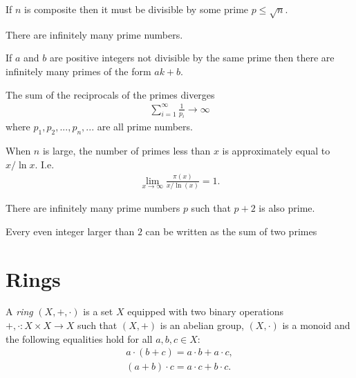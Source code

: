 \documentclass{article}
\begin{document}
\begin{theorem}[Boocher 2.5]
    If $n$ is composite then it must be divisible by some prime $p\leq\sqrt{n}$. 
\end{theorem}

\begin{theorem}
    There are infinitely many prime numbers. 
\end{theorem}

\begin{theorem}
    If $a$ and $b$ are positive integers not divisible by the same prime then there are
    infinitely many primes of the form $ak+b$. 
\end{theorem}

\begin{theorem}[Boocher 2.8]
    The sum of the reciprocals of the primes diverges
    \begin{align*}
        \sum_{i=1}^\infty \frac{1}{p_i} \to \infty
    \end{align*} 
    where $p_1,p_2,...,p_n,...$ are all prime numbers.
\end{theorem}

\begin{theorem}[Boocher 2.9]
    When $n$ is large, the number of primes less than $x$ is approximately equal to
    $x/\ln x$. I.e. 
    \begin{align*}
        \lim_{x\to\infty} \frac{\pi(x)}{x/\ln(x)}=1.
    \end{align*} 
\end{theorem}

\begin{conjecture}
    There are infinitely many prime numbers $p$ such that 
    $p+2$ is also prime.
\end{conjecture}

\begin{conjecture}
    Every even integer larger than $2$ can be written as the 
    sum of two primes
\end{conjecture}

\section{Rings}

\begin{definition}[Ring]
    A \emph{ring} $(X,+,\cdot)$ is a set $X$ equipped with two binary operations
    $+,\cdot:X\times X\to X$ such that $(X,+)$ is an abelian group, $(X,\cdot)$
    is a monoid and the following equalities hold for all $a,b,c\in X$:
    \begin{align*}
        a       \cdot (b + c)   = a \cdot b + a \cdot c, \\
        (a+b)   \cdot c         = a \cdot c + b \cdot c.
    \end{align*}
\end{definition}
\end{document}
